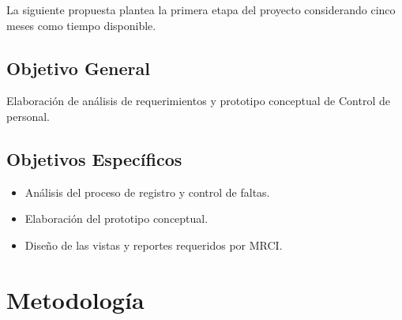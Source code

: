 \documentclass[10pt]{book}
\newcommand{\nombreProyecto}{ Control de personal}
\newcommand{\cliente}{MRCI}
\begin{document}
	La siguiente propuesta plantea la primera etapa del proyecto considerando cinco meses como tiempo disponible.

\section{Objetivo General}

	Elaboración de análisis de requerimientos y prototipo conceptual de \nombreProyecto.
\section{Objetivos Específicos}

\begin{itemize}
	\item Análisis del proceso de registro y control de faltas.
	\item Elaboración del prototipo conceptual.
	\item Diseño de las vistas y reportes requeridos por \cliente.
\end{itemize}

%
%
%
%

	
	
\chapter{Metodología}
\end{document}
